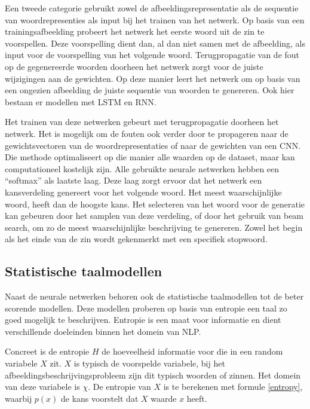 Een tweede categorie gebruikt zowel de afbeeldingsrepresentatie als de sequentie van 
woordrepresenties als input bij het trainen van het netwerk. Op basis van een trainingsafbeelding probeert het netwerk het eerste woord uit de zin te voorspellen. Deze voorspelling dient dan, al dan niet samen met de afbeelding, als input voor de voorspelling van het volgende woord. Terugpropagatie van de fout op de gegenereerde woorden doorheen het netwerk zorgt voor de juiste wijzigingen aan de gewichten. Op deze manier leert het netwerk om op basis van een ongezien afbeelding de juiste sequentie van woorden te genereren. Ook hier bestaan er modellen met LSTM\cite{Donahue2015,Google} en RNN\cite{Karpathy2015}. 

Het trainen van deze netwerken gebeurt met terugpropagatie doorheen het netwerk. Het is mogelijk om de fouten ook verder door te propageren naar de gewichtsvectoren van de woordrepresentaties of naar de gewichten van een CNN. Die methode optimaliseert op die manier alle waarden op de  dataset, maar kan computationeel kostelijk zijn.
Alle gebruikte neurale netwerken hebben een ``softmax'' als laatste laag. Deze laag zorgt ervoor dat het netwerk een kansverdeling genereert voor het volgende woord. Het meest waarschijnlijke woord, heeft dan de hoogste kans.
Het selecteren van het woord voor de generatie kan gebeuren door het samplen van deze verdeling, of door het gebruik van beam search, om zo de meest waarschijnlijke beschrijving te genereren.  Zowel het begin als het einde van de zin wordt gekenmerkt met een specifiek stopwoord.

\subsection{Statistische taalmodellen}
Naast de neurale netwerken behoren ook de statistische taalmodellen tot de beter scorende modellen. Deze modellen proberen op basis van entropie een taal zo goed mogelijk te beschrijven. Entropie is een maat voor informatie en dient verschillende doeleinden binnen het domein van NLP. 

Concreet is de entropie $H$ de hoeveelheid informatie voor die in een random variabele $X$ zit. $X$ is typisch de voorspelde variabele, bij het afbeeldingsbeschrijvingsprobleem zijn dit typisch woorden of zinnen. Het domein van deze variabele is $\chi$. De entropie van $X$ is te berekenen met formule \eqref{entropy}, waarbij $p(x)$ de kans voorstelt dat $X$ waarde $x$ heeft\cite{Jurafsky:2009:SLP:1214993}. 

